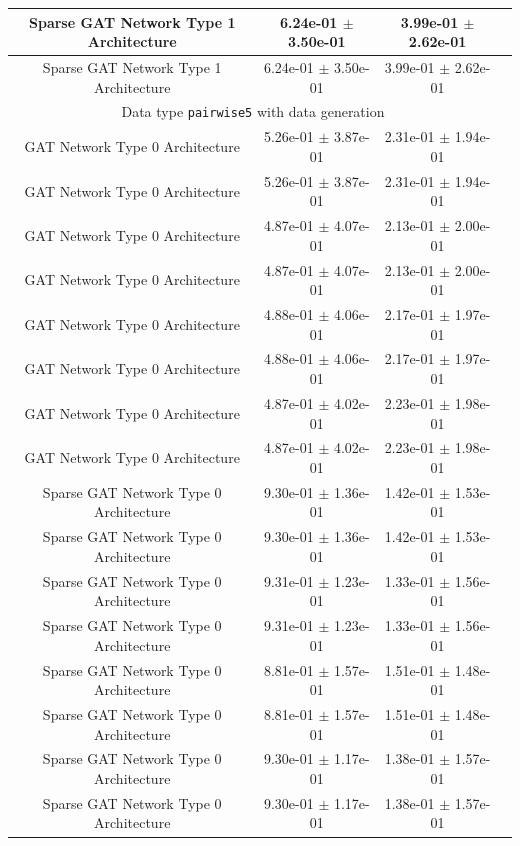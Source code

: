 \documentclass[a4paper]{article}
\begin{document}
\begin{table}[H]
\begin{tabular}{|c|c|c|c|}
Sparse GAT Network Type 1 Architecture   & 6.24e-01 $\pm$ 3.50e-01 & 3.99e-01 $\pm$ 2.62e-01 \\ \hline
Sparse GAT Network Type 1 Architecture   & 6.24e-01 $\pm$ 3.50e-01 & 3.99e-01 $\pm$ 2.62e-01 \\ \hline
\multicolumn{3}{|c|}{Data type \texttt{pairwise5} with data generation} \\ \hline
GAT Network Type 0 Architecture   & 5.26e-01 $\pm$ 3.87e-01 & 2.31e-01 $\pm$ 1.94e-01 \\ \hline
GAT Network Type 0 Architecture   & 5.26e-01 $\pm$ 3.87e-01 & 2.31e-01 $\pm$ 1.94e-01 \\ \hline
GAT Network Type 0 Architecture   & 4.87e-01 $\pm$ 4.07e-01 & 2.13e-01 $\pm$ 2.00e-01 \\ \hline
GAT Network Type 0 Architecture   & 4.87e-01 $\pm$ 4.07e-01 & 2.13e-01 $\pm$ 2.00e-01 \\ \hline
GAT Network Type 0 Architecture   & 4.88e-01 $\pm$ 4.06e-01 & 2.17e-01 $\pm$ 1.97e-01 \\ \hline
GAT Network Type 0 Architecture   & 4.88e-01 $\pm$ 4.06e-01 & 2.17e-01 $\pm$ 1.97e-01 \\ \hline
GAT Network Type 0 Architecture   & 4.87e-01 $\pm$ 4.02e-01 & 2.23e-01 $\pm$ 1.98e-01 \\ \hline
GAT Network Type 0 Architecture   & 4.87e-01 $\pm$ 4.02e-01 & 2.23e-01 $\pm$ 1.98e-01 \\ \hline
Sparse GAT Network Type 0 Architecture   & 9.30e-01 $\pm$ 1.36e-01 & 1.42e-01 $\pm$ 1.53e-01 \\ \hline
Sparse GAT Network Type 0 Architecture   & 9.30e-01 $\pm$ 1.36e-01 & 1.42e-01 $\pm$ 1.53e-01 \\ \hline
Sparse GAT Network Type 0 Architecture   & 9.31e-01 $\pm$ 1.23e-01 & 1.33e-01 $\pm$ 1.56e-01 \\ \hline
Sparse GAT Network Type 0 Architecture   & 9.31e-01 $\pm$ 1.23e-01 & 1.33e-01 $\pm$ 1.56e-01 \\ \hline
Sparse GAT Network Type 0 Architecture   & 8.81e-01 $\pm$ 1.57e-01 & 1.51e-01 $\pm$ 1.48e-01 \\ \hline
Sparse GAT Network Type 0 Architecture   & 8.81e-01 $\pm$ 1.57e-01 & 1.51e-01 $\pm$ 1.48e-01 \\ \hline
Sparse GAT Network Type 0 Architecture   & 9.30e-01 $\pm$ 1.17e-01 & 1.38e-01 $\pm$ 1.57e-01 \\ \hline
Sparse GAT Network Type 0 Architecture   & 9.30e-01 $\pm$ 1.17e-01 & 1.38e-01 $\pm$ 1.57e-01 \\ \hline
      \end{tabular}
      \label{fig:{0}_tab1}
\end{table}
\end{document}
